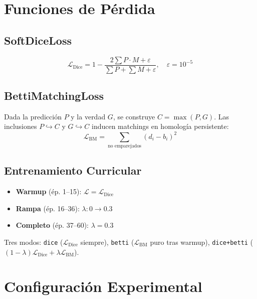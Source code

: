 \documentclass[10pt,twocolumn]{article}
\begin{document}
\section{Funciones de Pérdida}

\subsection{SoftDiceLoss}
\begin{equation}
\mathcal{L}_{\text{Dice}} = 1 - \frac{2 \sum P \cdot M + \varepsilon}{\sum P + \sum M + \varepsilon}, \quad \varepsilon = 10^{-5}
\end{equation}

\subsection{BettiMatchingLoss \cite{stucki2023}}

Dada la predicción $P$ y la verdad $G$, se construye $C = \max(P, G)$. Las inclusiones $P \hookrightarrow C$ y $G \hookrightarrow C$ inducen matchings en homología persistente:
\begin{equation}
\mathcal{L}_{\text{BM}} = \sum_{\text{no emparejados}} (d_i - b_i)^2
\end{equation}

\subsection{Entrenamiento Curricular}

\begin{itemize}[noitemsep]
\item \textbf{Warmup} (ép. 1--15): $\mathcal{L} = \mathcal{L}_{\text{Dice}}$
\item \textbf{Rampa} (ép. 16--36): $\lambda: 0 \to 0.3$
\item \textbf{Completo} (ép. 37--60): $\lambda = 0.3$
\end{itemize}

Tres modos: \texttt{dice} ($\mathcal{L}_{\text{Dice}}$ siempre), \texttt{betti} ($\mathcal{L}_{\text{BM}}$ puro tras warmup), \texttt{dice+betti} ($(1-\lambda)\mathcal{L}_{\text{Dice}} + \lambda\mathcal{L}_{\text{BM}}$).

\section{Configuración Experimental}
\end{document}
